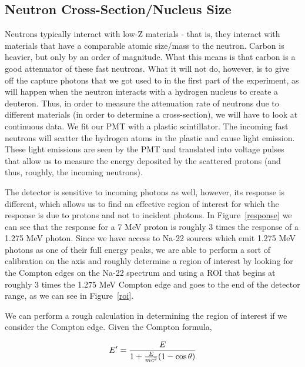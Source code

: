 \documentclass{article}
\DeclarePairedDelimiter{\parens}{\lparen}{\rparen}
\begin{document}
  \subsection{Neutron Cross-Section/Nucleus Size}
  Neutrons typically interact with low-Z materials - that is, they interact with materials that have a comparable atomic size/mass to the neutron.  Carbon is heavier, but only by an order of magnitude.  What this means is that carbon is a good attenuator of these fast neutrons.  What it will not do, however, is to give off the capture photons that we got used to in the first part of the experiment, as will happen when the neutron interacts with a hydrogen nucleus to create a deuteron.  Thus, in order to measure the attenuation rate of neutrons due to different materials (in order to determine a cross-section), we will have to look at continuous data.  We fit our PMT with a plastic scintillator.  The incoming fast neutrons will scatter the hydrogen atoms in the plastic and cause light emission.  These light emissions are seen by the PMT and translated into voltage pulses that allow us to measure the energy deposited by the scattered protons (and thus, roughly, the incoming neutrons).

  \hspace{.25cm}

  The detector is sensitive to incoming photons as well, however, its response is different, which allows us to find an effective region of interest for which the response is due to protons and not to incident photons.  In Figure~\ref{response} we can see that the response for a 7 MeV proton is roughly 3 times the response of a 1.275 MeV photon.  Since we have access to Na-22 sources which emit 1.275 MeV photons as one of their full energy peaks, we are able to perform a sort of calibration on the axis and roughly determine a region of interest by looking for the Compton edges on the Na-22 spectrum and using a ROI that begins at roughly 3 times the 1.275 MeV Compton edge and goes to the end of the detector range, as we can see in Figure~\ref{roi}.

  \hspace{.25cm}

  We can perform a rough calculation in determining the region of interest if we consider the Compton edge.  Given the Compton formula,

  \begin{equation*}
    E' = \frac{E}{1+\frac{E}{mc^2}\parens*{1-\cos{\theta}}}
  \end{equation*}
\end{document}
